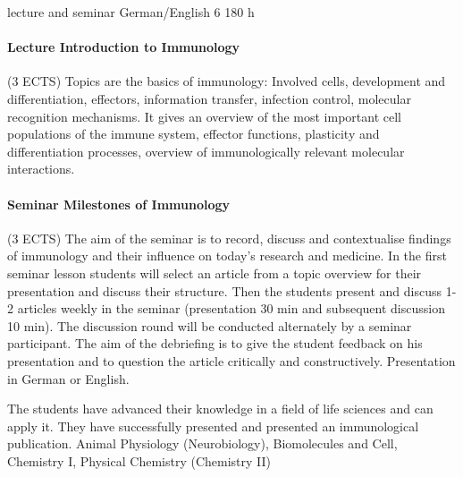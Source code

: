 {lecture and seminar}
{German/English}
{6}
{180 h} 
{\paragraph{Lecture Introduction to Immunology} (3 ECTS) Topics are the basics of immunology: Involved cells, development and differentiation, effectors, information transfer, infection control, molecular recognition mechanisms. It gives an overview of the most important cell populations of the immune system, effector functions, plasticity and differentiation processes, overview of immunologically relevant molecular interactions.
\paragraph{Seminar Milestones of Immunology} (3 ECTS) The aim of the seminar is to record, discuss and contextualise findings of immunology and their influence on today's research and medicine.
In the first seminar lesson students will select an article from a topic overview for their presentation and discuss their structure.
Then the students present and discuss 1-2 articles weekly in the seminar (presentation 30 min and subsequent discussion 10 min).
The discussion round will be conducted alternately by a seminar participant. 
The aim of the debriefing is to give the student feedback on his presentation and to question the article critically and constructively.
Presentation in German or English.}
{The students have advanced their knowledge in a field of life sciences and can apply it.
They have successfully presented and presented an immunological publication.}
{Animal Physiology (Neurobiology), Biomolecules and Cell, Chemistry I, Physical Chemistry (Chemistry II)}